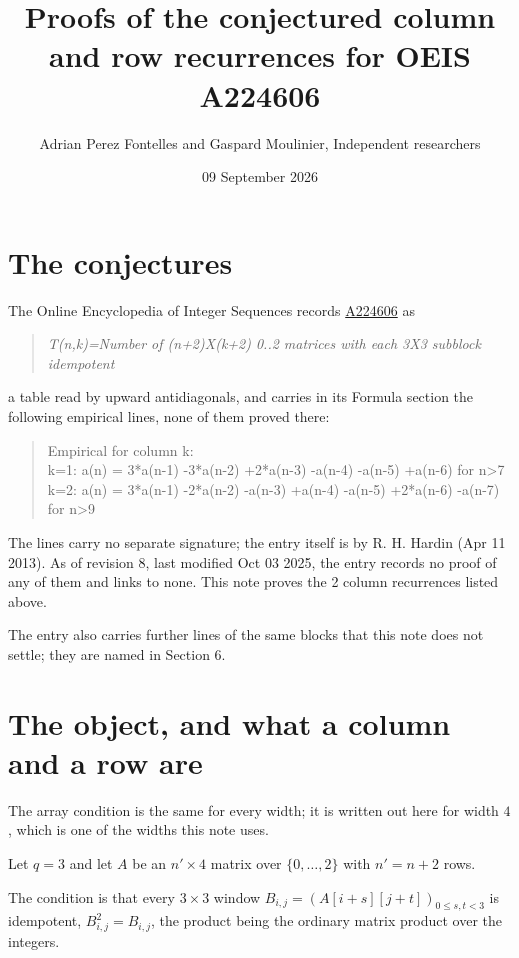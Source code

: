 \documentclass[11pt]{article}
\title{Proofs of the conjectured column and row recurrences for OEIS A224606}
\author{Adrian Perez Fontelles and Gaspard Moulinier, Independent researchers}
\date{09 September 2026}
\theoremstyle{definition}
\begin{document}
\maketitle
\section{The conjectures}

The Online Encyclopedia of Integer Sequences records \href{https://oeis.org/A224606}{A224606} as

\begin{quote}\itshape T(n,k)=Number of (n+2)X(k+2) 0..2 matrices with each 3X3 subblock idempotent\end{quote}

a table read by upward antidiagonals, and carries in its Formula section the following empirical lines, none of them proved there:

\begin{quote}\ttfamily Empirical for column k:\\
k=1: a(n) = 3*a(n-1) -3*a(n-2) +2*a(n-3) -a(n-4) -a(n-5) +a(n-6) for n>7\\k=2: a(n) = 3*a(n-1) -2*a(n-2) -a(n-3) +a(n-4) -a(n-5) +2*a(n-6) -a(n-7) for n>9\end{quote}

The lines carry no separate signature; the entry itself is by R. H. Hardin (Apr 11 2013). As of revision 8, last modified Oct 03 2025, the entry records no proof of any of them and links to none. This note proves the 2 column recurrences listed above.

The entry also carries further lines of the same blocks that this note does not settle; they are named in Section 6.

\section{The object, and what a column and a row are}

The array condition is the same for every width; it is written out here for width $4$, which is one of the widths this note uses.

Let $q = 3$ and let $A$ be an $n' \times 4$ matrix over $\{0,\dots,2\}$ with $n' = n + 2$ rows.

The condition is that every $3 \times 3$ window $B_{i,j} = (A[i{+}s][j{+}t])_{0 \le s,t < 3}$ is idempotent, $B_{i,j}^2 = B_{i,j}$, the product being the ordinary matrix product over the integers.
\end{document}
